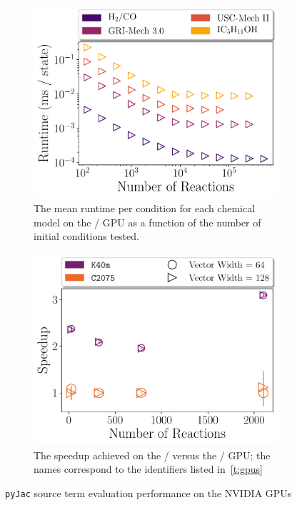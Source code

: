 \documentclass[12pt,number,sort&compress,preprint]{elsarticle}
\begin{document}
\begin{figure}[htbp!]
   \centering
  \begin{subfigure}[t]{0.48\linewidth}
      \includegraphics[width=\textwidth]{gpu_source_scaling.pdf}
      \caption{The mean runtime per condition for each chemical model on the \gpunew/ GPU as a function of the number of initial conditions tested.}
      \label{F:gpu_source_scaling}
  \end{subfigure}
  \hfill
  \begin{subfigure}[t]{0.48\linewidth}
      \includegraphics[width=\textwidth]{gpu_source_speedup.pdf}
      \caption{The speedup achieved on the \gpunew/ versus the \gpuold/ GPU; the names correspond to the identifiers listed in~\cref{t:gpus}}
      \label{F:gpu_source_speedup}
  \end{subfigure}
  \caption{\texttt{pyJac} source term evaluation performance on the NVIDIA GPUs}
  \label{F:gpu_source}
\end{figure}
\end{document}
